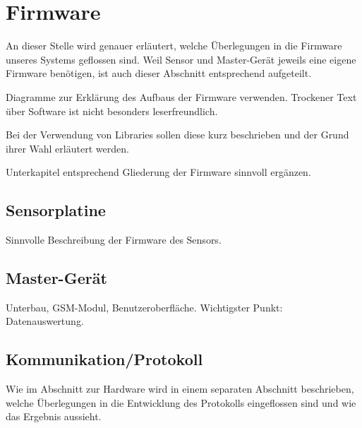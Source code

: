 \chapter{Firmware}
\label{chap:firmware}

An  dieser  Stelle wird  genauer  erl\"autert,  welche \"Uberlegungen  in  die
Firmware  unseres  Systems  geflossen  sind. Weil  Sensor  und  Master-Ger\"at
jeweils  eine   eigene  Firmware   ben\"otigen,  ist  auch   dieser  Abschnitt
entsprechend aufgeteilt.

\anweisung   Diagramme    zur   Erkl\"arung    des   Aufbaus    der   Firmware
verwenden. Trockener    Text    \"uber    Software   ist    nicht    besonders
leserfreundlich.

\anweisung Bei der Verwendung von  Libraries sollen diese kurz beschrieben und
der Grund ihrer Wahl erl\"autert werden.

\anweisung   Unterkapitel  entsprechend   Gliederung  der   Firmware  sinnvoll
erg\"anzen.

\section{Sensorplatine}
\label{sec:fw:sensorplatine}

Sinnvolle Beschreibung der Firmware des Sensors.


\section{Master-Ger\"at}
\label{sec:fw:mastergerat}

Unterbau, GSM-Modul, Benutzeroberfl\"ache. Wichtigster Punkt: Datenauswertung.


\section{Kommunikation/Protokoll}
\label{sec:fw:sensorplatine}

Wie im Abschnitt  zur Hardware wird in einem  separaten Abschnitt beschrieben,
welche \"Uberlegungen in die Entwicklung  des Protokolls eingeflossen sind und
wie das Ergebnis aussieht.
